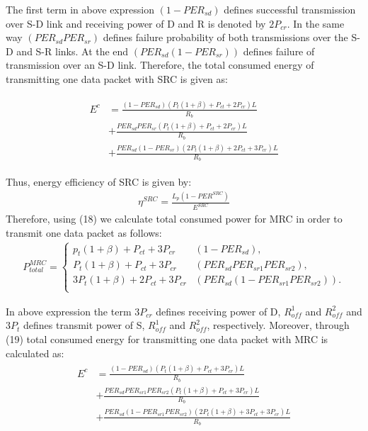 \documentclass{sig-alternate}
\begin{document}
The first term in above expression $(1-PER_{sd})$ defines successful transmission over S-D link and  receiving power of D and R is denoted by $2P_{cr}$. In the same way $(PER_{sd}PER_{sr})$ defines failure probability of both transmissions over the S-D and S-R links. At the end $(PER_{sd}(1-PER_{sr}))$ defines failure of transmission over an S-D link.
Therefore, the total consumed energy of transmitting one data packet with SRC is given as:

\begin{eqnarray}
\begin{split}
E^c &= \frac{(1-PER_{sd})(P_t(1+\beta)+P_{ct}+2P_{cr})L}{R_b} \\
&+\frac{PER_{sd}PER_{sr}(P_t(1+\beta)+P_{ct}+2P_{cr})L}{R_b} \\
&+\frac{PER_{sd}(1-PER_{sr})(2P_t(1+\beta)+2P_{ct}+3P_{cr})L}{R_b}
\end{split}
\end{eqnarray}
\normalsize

Thus, energy efficiency of SRC is given by:
\begin{eqnarray}
\eta^{SRC}=\frac{L_p(1-PER^{SRC})}{E^{SRC}}
\end{eqnarray}
Therefore, using (18) we calculate total consumed power for MRC in order to transmit one data packet as follows:
\tiny
\begin{eqnarray}
P^{MRC}_{total}=\left\{\begin{matrix}
 p_{t}(1+\beta)+P_{ct}+3P_{cr}&(1-PER_{sd}), \\
 P_t(1+\beta)+P_{ct}+3P_{cr}&(PER_{sd}PER_{sr1}PER_{sr2}), \\
 3P_t(1+\beta)+2P_{ct}+3P_{cr}&(PER_{sd}(1-PER_{sr1}PER_{sr2})). \\
\end{matrix}\right.
\end{eqnarray}
\normalsize

In above expression the term $3P_{cr}$ defines receiving power of D, $R^1_{off}$ and $R^2_{off}$ and $3P_t$ defines transmit power of S, $R^1_{off}$ and $R^2_{off}$, respectively. Moreover, through (19) total consumed energy for transmitting one data packet with MRC is calculated as:
\small
\begin{eqnarray}
\begin{split}
E^c &= \frac{(1-PER_{sd})(P_t(1+\beta)+P_{ct}+3P_{cr})L}{R_b} \\
&+\frac{PER_{sd}PER_{sr1}PER_{sr2}(P_t(1+\beta)+P_{ct}+3P_{cr})L}{R_b} \\
&+\frac{PER_{sd}(1-PER_{sr1}PER_{sr2})(2P_t(1+\beta)+3P_{ct}+3P_{cr})L}{R_b}
\end{split}
\end{eqnarray}
\normalsize
\end{document}
